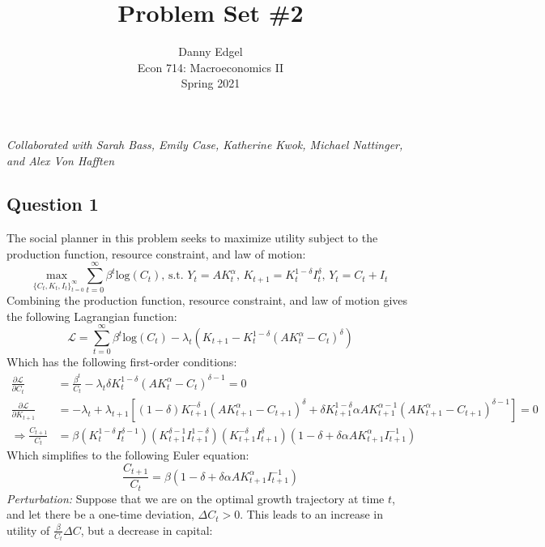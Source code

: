 \documentclass{article}
\newcommand{\loge}[1]{\text{log}\left(#1\right)}
\newcommand{\usmax}[1]{\underset{#1}{\text{max }}}
\renewcommand{\L}{\mathcal{L}}
\newcommand{\suminf}{\sum_{t=0}^\infty}
\begin{document}
\title{	Problem Set \#2 }
\author{ 	Danny Edgel 					\\ 
			Econ 714: Macroeconomics II		\\
			Spring 2021						\\
		}
\maketitle\thispagestyle{empty}


\noindent\textit{Collaborated with Sarah Bass, Emily Case, Katherine Kwok, Michael Nattinger, and Alex Von Hafften}


\subsection*{Question 1}
The social planner in this problem seeks to maximize utility subject to the production function, resource constraint, and law of motion:
\[
	\usmax{\{C_t,K_t,I_t\}_{t=0}^\infty}\suminf\beta^t\loge{C_t}\text{, s.t. }Y_t=AK_t^\alpha\text{, }K_{t+1}=K_t^{1-\delta}I_t^\delta\text{, }Y_t=C_t + I_t
\]
Combining the production function, resource constraint, and law of motion gives the following Lagrangian function:
\[
	\L = \suminf \beta^t\loge{C_t} - \lambda_t\left(K_{t+1} - K_t^{1-\delta}(AK_t^\alpha-C_t)^\delta\right)
\]
Which has the following first-order conditions:
\begin{align*}
	\frac{\partial\L}{\partial C_t} 	&= \frac{\beta^t}{C_t} - \lambda_t\delta K_t^{1-\delta}\left(AK_t^\alpha-C_t\right)^{\delta-1} 						= 0	\\
	\frac{\partial\L}{\partial K_{t+1}} 
		&= -\lambda_t + 
		\lambda_{t+1}\left[(1-\delta)K_{t+1}^{-\delta}\left(AK_{t+1}^\alpha-C_{t+1}\right)^\delta + \delta K_{t+1}^{1-\delta}\alpha AK_{t+1}^{\alpha-1}\left(AK_{t+1}^\alpha - C_{t+1}\right)^{\delta-1}\right] = 0 	\\
	\Rightarrow	\frac{C_{t+1}}{C_t} 
	&= \beta \left(K_t^{1-\delta}I_t^{\delta-1}\right)\left(K_{t+1}^{\delta-1}I_{t+1}^{1-\delta}\right)\left(K_{t+1}^{-\delta}I_{t+1}^\delta\right)\left(1-\delta + \delta\alpha AK_{t+1}^\alpha I_{t+1}^{-1}\right)
\end{align*}
Which simplifies to the following Euler equation:
\[
	\frac{C_{t+1}}{C_t} = \beta \left(1-\delta+\delta\alpha AK_{t+1}^\alpha I_{t+1}^{-1}\right)
\]
\textit{Perturbation:} Suppose that we are on the optimal growth trajectory at time $t$, and let there be a one-time deviation, $\Delta C_t>0$. This leads to an increase in utility of ${\frac{\beta}{C_t}\Delta C}$, but a decrease in capital:
\end{document}
